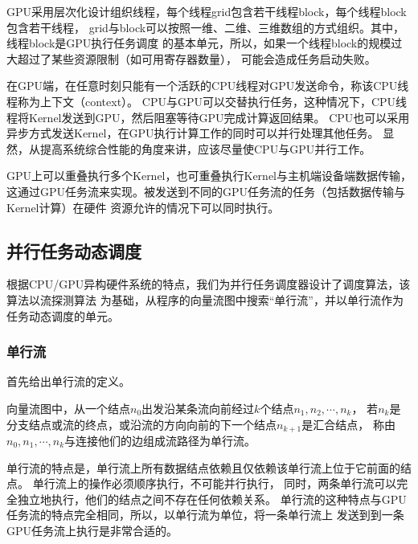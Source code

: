 GPU采用层次化设计组织线程，每个线程grid包含若干线程block，每个线程block包含若干线程，
grid与block可以按照一维、二维、三维数组的方式组织。其中，线程block是GPU执行任务调度
的基本单元，所以，如果一个线程block的规模过大超过了某些资源限制（如可用寄存器数量），
可能会造成任务启动失败。

在GPU端，在任意时刻只能有一个活跃的CPU线程对GPU发送命令，称该CPU线程称为上下文（context）。
CPU与GPU可以交替执行任务，这种情况下，CPU线程将Kernel发送到GPU，然后阻塞等待GPU完成计算返回结果。
CPU也可以采用异步方式发送Kernel，在GPU执行计算工作的同时可以并行处理其他任务。
显然，从提高系统综合性能的角度来讲，应该尽量使CPU与GPU并行工作。

GPU上可以重叠执行多个Kernel，也可重叠执行Kernel与主机端设备端数据传输，
这通过GPU任务流来实现。被发送到不同的GPU任务流的任务（包括数据传输与Kernel计算）在硬件
资源允许的情况下可以同时执行。

\subsection{并行任务动态调度}\label{subsec:task-scheduling}
根据CPU/GPU异构硬件系统的特点，我们为并行任务调度器设计了调度算法，该算法以流探测算法
为基础，从程序的向量流图中搜索“单行流”，并以单行流作为任务动态调度的单元。

\subsubsection{单行流}
首先给出单行流的定义。
\begin{definition}
  向量流图中，从一个结点$n_0$出发沿某条流向前经过$k$个结点$n_1, n_2, \cdots, n_k$，
  若$n_k$是分支结点或流的终点，或沿流的方向向前的下一个结点$n_{k+1}$是汇合结点，
  称由$n_0, n_1, \cdots, n_k$与连接他们的边组成流路径为单行流。
\end{definition}

单行流的特点是，单行流上所有数据结点依赖且仅依赖该单行流上位于它前面的结点。
单行流上的操作必须顺序执行，不可能并行执行，
同时，两条单行流可以完全独立地执行，他们的结点之间不存在任何依赖关系。
单行流的这种特点与GPU任务流的特点完全相同，所以，以单行流为单位，将一条单行流上
发送到到一条GPU任务流上执行是非常合适的。

\begin{quotation}
\end{quotation}

